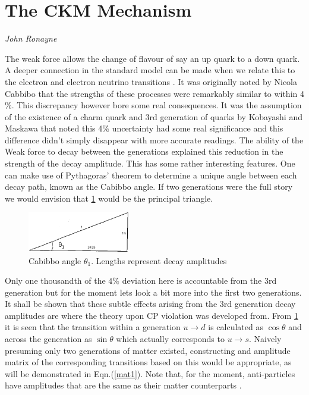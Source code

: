 %
\section{The CKM Mechanism}
\vspace{-1.0em}
\begin{center}
\tiny{\textit{John Ronayne}}
\end{center}

The weak force allows the change of flavour of say an up quark to a down quark. A deeper connection in the standard model can be made when we relate this to the electron and electron neutrino transitions \cite{CKM8}. It was originally noted by Nicola Cabbibo that the strengths of these processes were remarkably similar to within 4$\%$. This discrepancy however bore some real consequences. It was the assumption of the existence of a charm quark and 3rd generation of quarks by Kobayashi and Maskawa that noted this 4$\%$ uncertainty had some real significance and this difference didn't simply disappear with more accurate readings. The ability of the Weak force to decay between the generations explained this reduction in the strength of the decay amplitude. This has some rather interesting features. One can make use of Pythagoras' theorem to determine a unique angle between each decay path, known as the Cabibbo angle. If two generations were the full story we would envision that \cref{cabibbo} would be the principal triangle.

\begin{figure}[h]
\centering
\includegraphics[angle=1, width=0.4\textwidth]{figs/ckmfig1.jpg}
\caption{Cabibbo angle $\theta_1$. Lengths represent decay amplitudes}
\label{cabibbo}
\end{figure}

Only one thousandth of the $4\%$ deviation here is accountable from the 3rd generation but for the moment lets look a bit more into the first two generations.
It shall be shown that these subtle effects arising from the 3rd generation decay amplitudes are where the theory upon CP violation was developed from. From \cref{cabibbo} it is seen that the transition within a generation $u\rightarrow d$ is calculated as $\cos\theta$ and across the generation as $\sin\theta$ which actually corresponds to $u\rightarrow s$. Naively presuming only two generations of matter existed, constructing and amplitude matrix of the corresponding transitions based on this would be appropriate, as will be demonstrated in Eqn.(\ref{mat1}). Note that, for the moment, anti-particles have amplitudes that are the same as their matter counterparts \cite{CKM1}.

